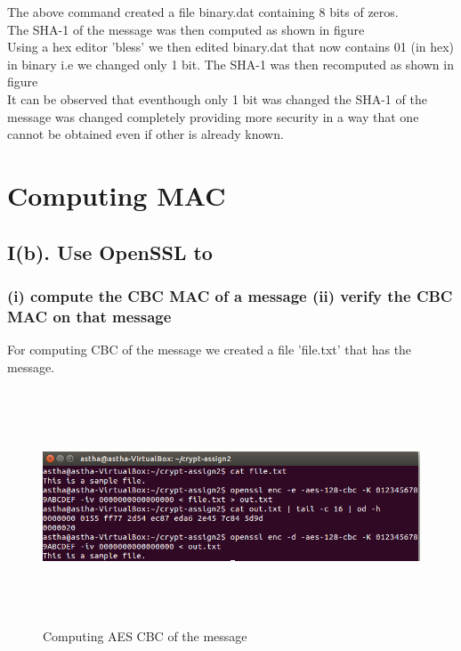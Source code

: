 \documentclass{article}
\begin{document}
\noindent The above command created a file binary.dat containing 8 bits of zeros.\\

\noindent The SHA-1 of the message was then computed as shown in figure\\

\noindent Using a hex editor 'bless' we then edited binary.dat that now contains 01 (in hex) in binary i.e we changed only 1 bit. The SHA-1 was then recomputed as shown in figure\\

\noindent It can be observed that eventhough only 1 bit was changed the SHA-1 of the message was changed completely providing more security in a way that one cannot be obtained even if other is already known.
 
 


\section*{Computing MAC}
\subsection*{I(b). Use OpenSSL to}
\subsubsection*{(i) compute the CBC MAC of a message (ii) verify the CBC MAC on that message} 

\noindent For computing CBC of the message we created a file 'file.txt' that has the message.

	\begin{figure}[htb]
	    \begin{center}
		\includegraphics[width=15cm,height=7cm]{question1b1.png}
		\caption{Computing AES CBC of the message}
	     \end{center}
	\end{figure}
\end{document}
